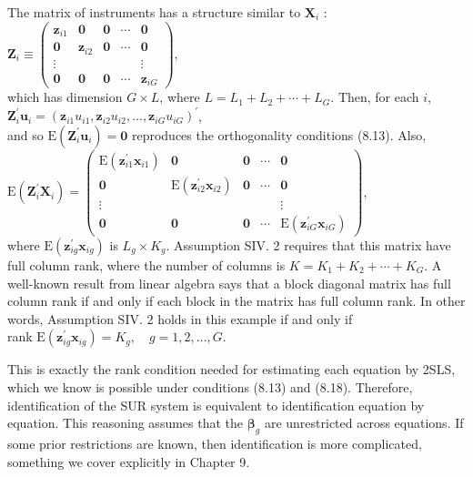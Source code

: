 \documentclass[10pt]{article}
\begin{document}
The matrix of instruments has a structure similar to $\mathbf{X}_{i}$ :\\
$\mathbf{Z}_{i} \equiv\left(\begin{array}{ccccc}\mathbf{z}_{i 1} & \mathbf{0} & \mathbf{0} & \cdots & \mathbf{0} \\ \mathbf{0} & \mathbf{z}_{i 2} & \mathbf{0} & \cdots & \mathbf{0} \\ \vdots & & & & \vdots \\ \mathbf{0} & \mathbf{0} & \mathbf{0} & \cdots & \mathbf{z}_{i G}\end{array}\right)$,\\
which has dimension $G \times L$, where $L=L_{1}+L_{2}+\cdots+L_{G}$. Then, for each $i$, $\mathbf{Z}_{i}^{\prime} \mathbf{u}_{i}=\left(\mathbf{z}_{i 1} u_{i 1}, \mathbf{z}_{i 2} u_{i 2}, \ldots, \mathbf{z}_{i G} u_{i G}\right)^{\prime}$,\\
and so $\mathrm{E}\left(\mathbf{Z}_{i}^{\prime} \mathbf{u}_{i}\right)=\mathbf{0}$ reproduces the orthogonality conditions (8.13). Also,\\
$\mathrm{E}\left(\mathbf{Z}_{i}^{\prime} \mathbf{X}_{i}\right)=\left(\begin{array}{ccccc}\mathrm{E}\left(\mathbf{z}_{i 1}^{\prime} \mathbf{x}_{i 1}\right) & \mathbf{0} & \mathbf{0} & \cdots & \mathbf{0} \\ \mathbf{0} & \mathrm{E}\left(\mathbf{z}_{i 2}^{\prime} \mathbf{x}_{i 2}\right) & \mathbf{0} & \cdots & \mathbf{0} \\ \vdots & & & & \vdots \\ \mathbf{0} & \mathbf{0} & \mathbf{0} & \cdots & \mathrm{E}\left(\mathbf{z}_{i G}^{\prime} \mathbf{x}_{i G}\right)\end{array}\right)$,\\
where $\mathrm{E}\left(\mathbf{z}_{i g}^{\prime} \mathbf{x}_{i g}\right)$ is $L_{g} \times K_{g}$. Assumption SIV. 2 requires that this matrix have full column rank, where the number of columns is $K=K_{1}+K_{2}+\cdots+K_{G}$. A well-known result from linear algebra says that a block diagonal matrix has full column rank if and only if each block in the matrix has full column rank. In other words, Assumption SIV. 2 holds in this example if and only if\\
rank $\mathrm{E}\left(\mathbf{z}_{i g}^{\prime} \mathbf{x}_{i g}\right)=K_{g}, \quad g=1,2, \ldots, G$.

This is exactly the rank condition needed for estimating each equation by 2SLS, which we know is possible under conditions (8.13) and (8.18). Therefore, identification of the SUR system is equivalent to identification equation by equation. This reasoning assumes that the $\boldsymbol{\beta}_{g}$ are unrestricted across equations. If some prior restrictions are known, then identification is more complicated, something we cover explicitly in Chapter 9.
\end{document}

